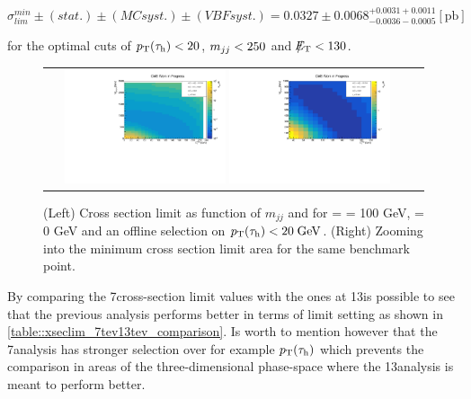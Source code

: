 \begin{equation}
\sigma_{lim}^{min}\pm(stat.)\pm(MC syst.)\pm(VBF syst.) = 0.0327\pm0.0068^{+0.0031+ 0.0011}_{-0.0036-0.0005} [\text{pb}]
\label{eq::xsec_lim_best_result}
\end{equation}

for the optimal cuts of  $p_{\text{T}}(\tau_{\text{h}}) <  20$,  $ m_{jj}< 250 $ and $\slash\mkern-12mu{E}_{\text{T}} < 130$.

\begin{figure}[tbh!]
	\centering
	\begin{tabular}{cc}
		\includegraphics[width=0.45\textwidth]{analysis/pics/JetInvMass_vs_MET_xsec_chi100_lsp000_taupt20.pdf}
		\includegraphics[width=0.45\textwidth]{analysis/pics/JetInvMass_vs_MET_xsec_chi100_lsp000_taupt20_zoom.pdf} 		
	\end{tabular}
	\caption{(Left) Cross section limit as function of $m_{jj}$ and \met for \charginopm = \neutralinotwo = 100 GeV, \neutralinoone = 0 GeV and an offline selection on $p_{\text{T}}(\tau_{\text{h}}) <  20\;\text{Ge}\kern-0.06667em\text{V}$. (Right) Zooming into the minimum cross section limit area for the same benchmark point.}
	\label{fig::xsec_lim_selected_results}
\end{figure}

By comparing the 7\tev cross-section limit values with the ones at 13\tev is possible to see that the previous analysis performs better in terms of limit setting as shown in \autoref{table::xseclim_7tev13tev_comparison}. Is worth to mention however that the 7\tev analysis has stronger selection over for example  $p_{\text{T}}(\tau_{\text{h}})$ which prevents the comparison in areas of the three-dimensional phase-space where the 13\tev analysis is meant to perform better.

